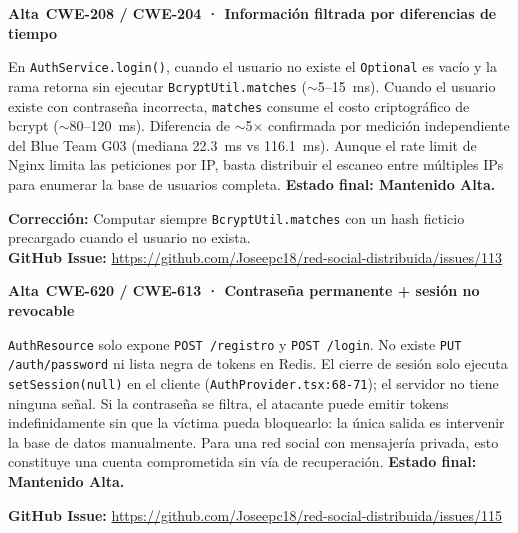 \documentclass[10pt,a4paper]{article}
\newcommand{\code}[1]{\nolinkurl{#1}}
\newcommand{\badgeAlta}{\colorbox{orange!20}{\textcolor{orange!90!black}{\textbf{\footnotesize Alta}}}}
\begin{document}
\begin{tcolorbox}[colback=red!4,colframe=redteamcolor!40,arc=2mm,title={\textbf{Top 2 — H-11 · Timing Attack y Enumeración de Usuarios en Login (Issue \#113)}}]
\badgeAlta\ \textbf{CWE-208 / CWE-204 · Información filtrada por diferencias de tiempo}

En \code{AuthService.login()}, cuando el usuario no existe el \code{Optional} es vacío y la rama retorna sin ejecutar \code{BcryptUtil.matches} ($\sim$5--15~ms). Cuando el usuario existe con contraseña incorrecta, \code{matches} consume el costo criptográfico de bcrypt ($\sim$80--120~ms). Diferencia de $\sim$5$\times$ confirmada por medición independiente del Blue Team G03 (mediana 22.3~ms vs 116.1~ms). Aunque el rate limit de Nginx limita las peticiones por IP, basta distribuir el escaneo entre múltiples IPs para enumerar la base de usuarios completa. \textbf{Estado final: Mantenido Alta.}

\textbf{Corrección:} Computar siempre \code{BcryptUtil.matches} con un hash ficticio precargado cuando el usuario no exista.\\
\textbf{GitHub Issue:} \url{https://github.com/Joseepc18/red-social-distribuida/issues/113}
\end{tcolorbox}

\begin{tcolorbox}[colback=red!4,colframe=redteamcolor!40,arc=2mm,title={\textbf{Top 3 — H-28 · Credencial Inmutable: Sin Cambio de Contraseña ni Revocación JWT (Issue \#115)}}]
\badgeAlta\ \textbf{CWE-620 / CWE-613 · Contraseña permanente + sesión no revocable}

\code{AuthResource} solo expone \code{POST /registro} y \code{POST /login}. No existe \code{PUT /auth/password} ni lista negra de tokens en Redis. El cierre de sesión solo ejecuta \code{setSession(null)} en el cliente (\code{AuthProvider.tsx:68-71}); el servidor no tiene ninguna señal. Si la contraseña se filtra, el atacante puede emitir tokens indefinidamente sin que la víctima pueda bloquearlo: la única salida es intervenir la base de datos manualmente. Para una red social con mensajería privada, esto constituye una cuenta comprometida sin vía de recuperación. \textbf{Estado final: Mantenido Alta.}

\textbf{GitHub Issue:} \url{https://github.com/Joseepc18/red-social-distribuida/issues/115}
\end{tcolorbox}

\end{document}
